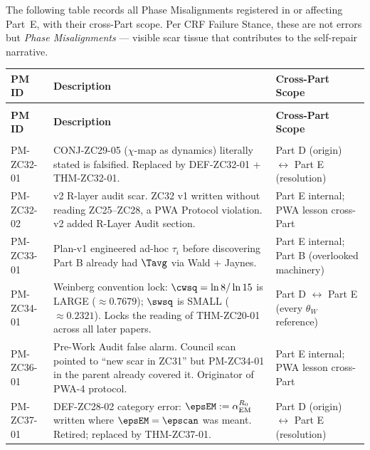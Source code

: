 \documentclass[12pt, a4paper]{article}
\begin{document}
The following table records all Phase Misalignments registered in or
affecting Part~E, with their cross-Part scope. Per CRF Failure Stance,
these are not errors but \emph{Phase Misalignments} --- visible scar
tissue that contributes to the self-repair narrative.

\medskip

{\small
\setlength{\LTpre}{4pt}
\setlength{\LTpost}{4pt}
\renewcommand{\arraystretch}{1.30}
\begin{longtable}{>{\raggedright\arraybackslash}p{2.7cm}
                  >{\raggedright\arraybackslash}p{5.8cm}
                  >{\raggedright\arraybackslash}p{4.0cm}}
\toprule
\textbf{PM ID} & \textbf{Description} & \textbf{Cross-Part Scope} \\
\midrule
\endfirsthead
\multicolumn{3}{l}{\small\textit{(continued)}} \\[4pt]
\toprule
\textbf{PM ID} & \textbf{Description} & \textbf{Cross-Part Scope} \\
\midrule
\endhead
\midrule
\multicolumn{3}{r}{\small\textit{(continues)}} \\
\endfoot
\bottomrule
\endlastfoot
PM-ZC32-01 &
  CONJ-ZC29-05 ($\chi$-map as dynamics) literally stated is falsified.
  Replaced by DEF-ZC32-01 + THM-ZC32-01. &
  Part D (origin) $\leftrightarrow$ Part E (resolution) \\

PM-ZC32-02 &
  v2 R-layer audit scar. ZC32 v1 written without reading ZC25--ZC28,
  a PWA Protocol violation. v2 added R-Layer Audit section. &
  Part E internal; PWA lesson cross-Part \\

PM-ZC33-01 &
  Plan-v1 engineered ad-hoc $\tau_i$ before discovering Part B already
  had $\Tavg$ via Wald + Jaynes. &
  Part E internal; Part B (overlooked machinery) \\

PM-ZC34-01 &
  Weinberg convention lock: $\cwsq = \ln 8/\ln 15$ is LARGE
  ($\approx 0.7679$); $\swsq$ is SMALL ($\approx 0.2321$). Locks the
  reading of THM-ZC20-01 across all later papers. &
  Part D $\leftrightarrow$ Part E (every $\theta_W$ reference) \\

PM-ZC36-01 &
  Pre-Work Audit false alarm. Council scan pointed to ``new scar in
  ZC31'' but PM-ZC34-01 in the parent already covered it. Originator
  of PWA-4 protocol. &
  Part E internal; PWA lesson cross-Part \\

PM-ZC37-01 &
  DEF-ZC28-02 category error: $\epsEM := \alpha_{\rm EM}^{R_0}$ written
  where $\epsEM = \epscan$ was meant. Retired; replaced by
  THM-ZC37-01. &
  Part D (origin) $\leftrightarrow$ Part E (resolution) \\


\end{longtable}}
\end{document}
